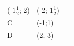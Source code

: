 {\begin{tabular}[t]{|l|l|l|}
    
        (-$1\frac{1}{2}$;-2) &
    
    
        (-2;-1$\frac{1}{2}$)%
     \tabularnewline\cline{1-1}\cline{2-2}\cline{3-3}
    
    
        C &
    
    
        (-1;1) &
    
    
     \tabularnewline\cline{1-1}\cline{2-2}\cline{3-3}
    
    
        D &
    
    
        (2;-3) &
    
    
     \tabularnewline\cline{1-1}\cline{2-2}\cline{3-3}
    \end{tabular}} %
      \addtocounter{footnote}{-0}
      
